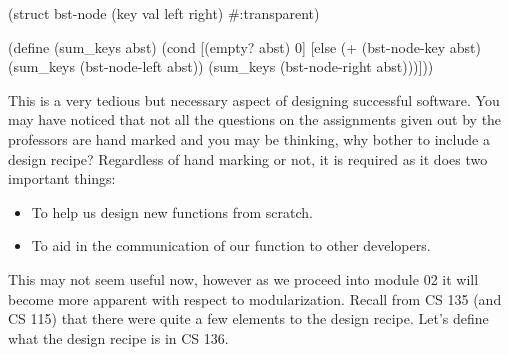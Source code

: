 
\begin{code}[Lisp]
(struct bst-node (key val left right) #:transparent)

(define (sum_keys abst)
	(cond
		[(empty? abst) 0]
		[else (+ (bst-node-key abst) 
		      	 (sum_keys (bst-node-left abst)) 
		         (sum_keys (bst-node-right abst)))]))
\end{code}



This is a very tedious but necessary aspect of designing successful software. You may have noticed that not all the questions on the assignments given out by the professors are hand marked and you may be thinking, why bother to include a design recipe? Regardless of hand marking or not, it is required as it does two important things:

\begin{itemize}

\item To help us design new functions from scratch.
\item To aid in the communication of our function to other developers.

\end{itemize}

This may not seem useful now, however as we proceed into module 02 it will become more apparent with respect to modularization. Recall from CS 135 (and CS 115) that there were quite a few elements to the design recipe. Let's define what the design recipe is in CS 136.\\


